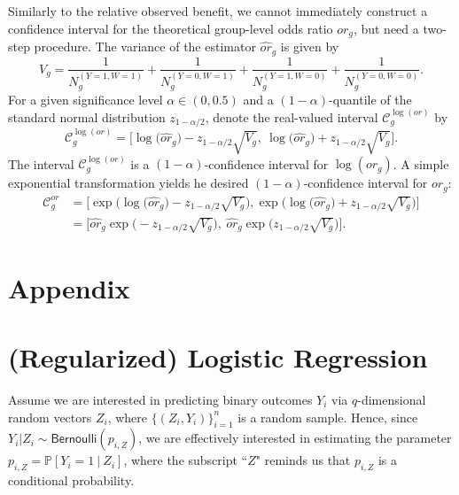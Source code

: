 \documentclass[11pt]{article}
\renewcommand{\P}{\mathbb{P}}
\begin{document}
Similarly to the relative observed benefit, we cannot immediately construct a confidence interval for the theoretical group-level odds ratio $or_g$, but need a two-step procedure.
The variance of the estimator $\widehat{or}_g$ is given by
\begin{equation}
    V_g = \frac{1}{N_g^{(Y=1, W=1)}} + 
    \frac{1}{N_g^{(Y=0, W=1)}} +
    \frac{1}{N_g^{(Y=1, W=0)}} + 
    \frac{1}{N_g^{(Y=0, W=0)}}.
\end{equation}
For a given significance level $\alpha \in (0,0.5)$ and a $(1-\alpha)$-quantile of the standard normal distribution $z_{1-\alpha / 2}$, denote the real-valued interval $\mathcal{C}_g^{\log (or)}$ by
\begin{equation}
    \mathcal{C}^{\log(or)}_g
    =
    \Big[
    \log \big( \widehat{or}_g\big) - z_{1-\alpha / 2} \sqrt{V_g},\ 
    \log \big( \widehat{or}_g\big) + z_{1-\alpha / 2} \sqrt{V_g}
    \Big].
\end{equation}
The interval $\mathcal{C}_g^{\log (or)}$ is a $(1-\alpha)$-confidence interval for $\log(or_g)$. A simple exponential transformation yields he desired $(1-\alpha)$-confidence interval for $or_g$:
\begin{equation}
\begin{split}
    \mathcal{C}_g^{or}
    &=
    \Bigg[ 
    \exp\Big( \log \big( \widehat{or}_g\big) - z_{1-\alpha / 2} \sqrt{V_g} \Big),
    \exp\Big( \log \big( \widehat{or}_g\big) + z_{1-\alpha / 2} \sqrt{V_g} \Big)
    \Bigg]
    \\
    &=
   \Bigg[ 
   \widehat{or}_g 
   \exp \Big(
   - z_{1-\alpha / 2} \sqrt{V_g} \Big),\ 
   \widehat{or}_g 
   \exp \Big(
    z_{1-\alpha / 2} \sqrt{V_g} \Big)
    \Bigg].
\end{split}
\end{equation}




\newpage
\appendix
\section*{Appendix}


\section{(Regularized) Logistic Regression}\label{sec:logistic-regression}
Assume we are interested in predicting binary outcomes $Y_i$ via $q$-dimensional random vectors $Z_i$, where $\{(Z_i, Y_i)\}_{i=1}^n$ is a random sample. Hence, since $Y_i|Z_i \sim \textsf{Bernoulli}(p_{i,Z})$, we are effectively interested in estimating the parameter $p_{i,Z} = \P[Y_i = 1 \ |\ Z_i]$, where the subscript ``$Z$" reminds us that $p_{i,Z}$ is a conditional probability.
\end{document}
